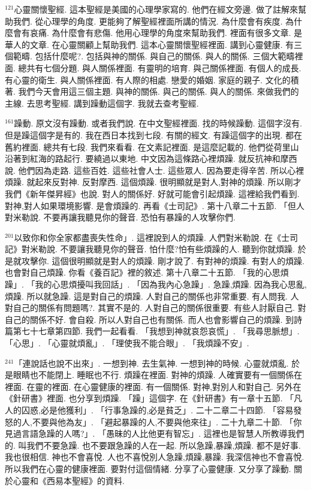 \documentclass{book}
\begin{document}
$^{121}$心靈關懷聖經.
這本聖經是美國的心理學家寫的.
他們在經文旁邊.
做了註解來幫助我們.
從心理學的角度.
更能夠了解聖經裡面所講的情況.
為什麼會有疾度.
為什麼會有哀痛.
為什麼會有悲傷.
他用心理學的角度來幫助我們.
裡面有很多文章.
是華人的文章.
在心靈關顧上幫助我們.
這本心靈關懷聖經裡面.
講到心靈健康.
有三個範疇.
包括什麼呢?.
包括與神的關係.
與自己的關係.
與人的關係.
三個大範疇裡面.
總共有七個分題.
與人關係裡面.
有靈明的培育.
與己關係裡面.
有個人的成長.
有心靈的衛生.
與人關係裡面.
有人際的相處.
戀愛的婚姻.
家庭的親子.
文化的積著.
我們今天會用這三個主題.
與神的關係.
與己的關係.
與人的關係.
來做我們的主線.
去思考聖經.
講到躁動這個字.
我就去查考聖經.

$^{161}$躁動.
原文沒有躁動.
或者我們說.
在中文聖經裡面.
找的時候躁動.
這個字沒有.
但是躁這個字是有的.
我在西日本找到七段.
有關的經文.
有躁這個字的出現.
都在舊約裡面.
總共有七段.
我們來看看.
在文素記裡面.
是這麼記載的.
他們從荷里山沿著到紅海的路起行.
要繞過以東地.
中文因為這條路心裡煩躁.
就反抗神和摩西說.
他們因為走路.
這些百姓.
這些社會人士.
這些眾人.
因為要走得辛苦.
所以心裡煩躁.
就起來反對神.
反對摩西.
這個煩躁.
很明顯就是對人,對神的煩躁.
所以剛才我們《新年傑昇經》也說.
對人的關係好.
好就可能會引起煩躁.
這裡給我們看到.
對神,對人如果環境影響.
是會煩躁的.
再看《士司記》.
第十八章二十五節.
「但人對米勒說.
不要再讓我聽見你的聲音.
恐怕有暴躁的人攻擊你們.

$^{201}$以致你和你全家都盡喪失性命」.
這裡說到人的煩躁.
人們對米勒說.
在《士司記》對米勒說.
不要讓我聽見你的聲音.
怕什麼?怕有些煩躁的人.
聽到你就煩躁.
於是就攻擊你.
這個很明顯就是對人的煩躁.
剛才說了.
有對神的煩躁.
有對人的煩躁.
也會對自己煩躁.
你看《養百記》裡的敘述.
第十八章二十五節.
「我的心思煩躁」.
「我的心思煩擾叫我回話」.
「因為我內心急躁」.
急躁,煩躁.
因為我心思亂,煩躁.
所以就急躁.
這是對自己的煩躁.
人對自己的關係也非常重要.
有人問我.
人對自己的關係有問題嗎?.
其實不是的.
人對自己的關係很重要.
有些人討厭自己.
對自己的關係不好.
會自殺.
所以人對自己也有關係.
而人也會影響自己的煩躁.
到詩篇第七十七章第四節.
我們一起看看.
「我想到神就哀怨哀慌」.
「我尋思脈想」.
「心思」.
「心靈就煩亂」.
「理使我不能合眼」.
「我煩躁不安」.

$^{241}$「連說話也說不出來」.
一想到神.
去生氣神.
一想到神的時候.
心靈就煩亂.
於是眼睛也不能閉上.
睡眠也不行.
煩躁在裡面.
對神的煩躁.
人確實要有一個關係在裡面.
在靈的裡面.
在心靈健康的裡面.
有一個關係.
對神,對別人和對自己.
另外在《針研書》裡面.
也分享到煩躁.
「躁」這個字.
在《針研書》有一章十五節.
「凡人的囚惑,必是他獲利」.
「行事急躁的,必是貧乏」.
二十二章二十四節.
「容易發怒的人,不要與他為友」.
「避起暴躁的人,不要與他來往」.
二十九章二十節.
「你見過言語急躁的人嗎?」.
「愚昧的人比他更有智忘」.
這裡也是智慧人所教導我們的.
叫我們不要急躁.
也不要跟急躁的人在一起.
所以急躁,暴躁,煩躁.
都不是好事.
我也很相信.
神也不會喜悅.
人也不喜悅別人急躁,煩躁,暴躁.
我深信神也不會喜悅.
所以我們在心靈的健康裡面.
要對付這個情緒.
分享了心靈健康.
又分享了躁動.
關於心靈和《西易本聖經》的資料.
\end{document}
